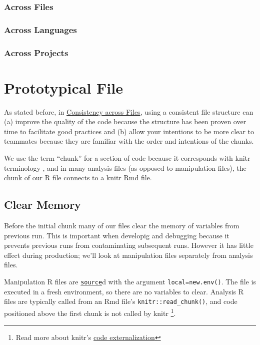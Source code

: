 \documentclass[
]{book}
\begin{document}
\hypertarget{consistency-files}{%
\subsection{Across Files}\label{consistency-files}}

\hypertarget{across-languages}{%
\subsection{Across Languages}\label{across-languages}}

\hypertarget{across-projects}{%
\subsection{Across Projects}\label{across-projects}}

\hypertarget{file-prototype}{%
\chapter{Prototypical File}\label{file-prototype}}

As stated before, in \protect\hyperlink{consistency-files}{Consistency across Files}, using a consistent file structure can (a) improve the quality of the code because the structure has been proven over time to facilitate good practices and (b) allow your intentions to be more clear to teammates because they are familiar with the order and intentions of the chunks.

We use the term ``chunk'' for a section of code because it corresponds with knitr terminology \citep{xie2015}, and in many analysis files (as opposed to manipulation files), the chunk of our R file connects to a knitr Rmd file.

\hypertarget{chunk-clear}{%
\section{Clear Memory}\label{chunk-clear}}

Before the initial chunk many of our files clear the memory of variables from previous run. This is important when developig and debugging because it prevents previous runs from contaminating subsequent runs. However it has little effect during production; we'll look at manipulation files separately from analysis files.

Manipulation R files are \href{https://stat.ethz.ch/R-manual/R-devel/library/base/html/source.html}{\texttt{source}}d with the argument \texttt{local=new.env()}. The file is executed in a fresh environment, so there are no variables to clear. Analysis R files are typically called from an Rmd file's \texttt{knitr::read\_chunk()}, and code positioned above the first chunk is not called by knitr \footnote{Read more about knitr's \href{https://yihui.name/knitr/demo/externalization/}{code externalization}}.
\end{document}

